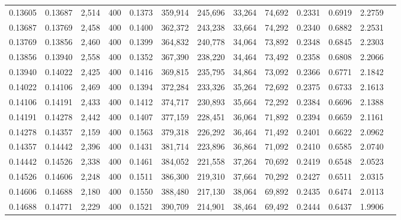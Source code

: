 \begin{tabular}{rrrrrrrrrrrrr}
0.13605 & 0.13687 &  2,514 & 400 &                                     0.1373 & 359,914 & 245,696 &  33,264 &  74,692 & 0.2331 & 0.6919 & 2.2759 \\
0.13687 & 0.13769 &  2,458 & 400 &                                     0.1400 & 362,372 & 243,238 &  33,664 &  74,292 & 0.2340 & 0.6882 & 2.2531 \\
0.13769 & 0.13856 &  2,460 & 400 &                                     0.1399 & 364,832 & 240,778 &  34,064 &  73,892 & 0.2348 & 0.6845 & 2.2303 \\
0.13856 & 0.13940 &  2,558 & 400 &                                     0.1352 & 367,390 & 238,220 &  34,464 &  73,492 & 0.2358 & 0.6808 & 2.2066 \\
0.13940 & 0.14022 &  2,425 & 400 &                                     0.1416 & 369,815 & 235,795 &  34,864 &  73,092 & 0.2366 & 0.6771 & 2.1842 \\
0.14022 & 0.14106 &  2,469 & 400 &                                     0.1394 & 372,284 & 233,326 &  35,264 &  72,692 & 0.2375 & 0.6733 & 2.1613 \\
0.14106 & 0.14191 &  2,433 & 400 &                                     0.1412 & 374,717 & 230,893 &  35,664 &  72,292 & 0.2384 & 0.6696 & 2.1388 \\
0.14191 & 0.14278 &  2,442 & 400 &                                     0.1407 & 377,159 & 228,451 &  36,064 &  71,892 & 0.2394 & 0.6659 & 2.1161 \\
0.14278 & 0.14357 &  2,159 & 400 &                                     0.1563 & 379,318 & 226,292 &  36,464 &  71,492 & 0.2401 & 0.6622 & 2.0962 \\
0.14357 & 0.14442 &  2,396 & 400 &                                     0.1431 & 381,714 & 223,896 &  36,864 &  71,092 & 0.2410 & 0.6585 & 2.0740 \\
0.14442 & 0.14526 &  2,338 & 400 &                                     0.1461 & 384,052 & 221,558 &  37,264 &  70,692 & 0.2419 & 0.6548 & 2.0523 \\
0.14526 & 0.14606 &  2,248 & 400 &                                     0.1511 & 386,300 & 219,310 &  37,664 &  70,292 & 0.2427 & 0.6511 & 2.0315 \\
0.14606 & 0.14688 &  2,180 & 400 &                                     0.1550 & 388,480 & 217,130 &  38,064 &  69,892 & 0.2435 & 0.6474 & 2.0113 \\
0.14688 & 0.14771 &  2,229 & 400 &                                     0.1521 & 390,709 & 214,901 &  38,464 &  69,492 & 0.2444 & 0.6437 & 1.9906 \\

\end{tabular}
